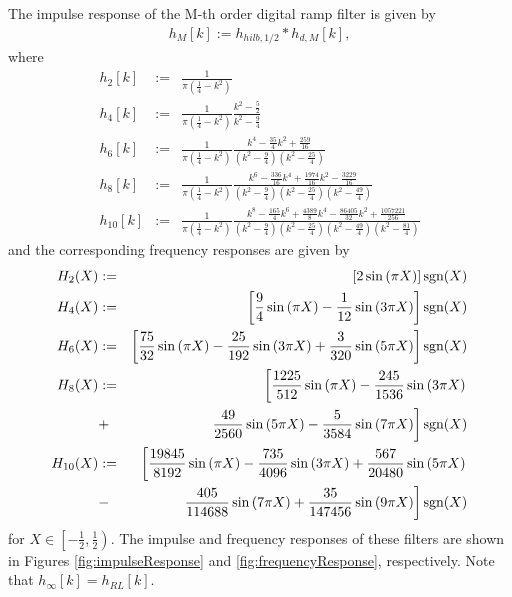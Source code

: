 The impulse response of the M-th order digital ramp filter is given by
\begin{eqnarray}
h_M[k] := h_{hilb,1/2} * h_{d,M}[k], \label{eq:convHilbertAndDeriv}
\end{eqnarray}
where
\begin{eqnarray}
h_2[k] &:=& \frac{1}{\pi\left(\frac{1}{4}-k^2\right)} \label{eq:RAMP_FD2} \\
h_4[k] &:=& \frac{1}{\pi\left(\frac{1}{4}-k^2\right)} \frac{k^2-\frac{5}{2}}{k^2-\frac{9}{4}} \label{eq:RAMP_FD4} \\
h_6[k] &:=& \frac{1}{\pi\left(\frac{1}{4}-k^2\right)} \frac{k^4-\frac{35}{4}k^2+\frac{259}{16}}{\left(k^2-\frac{9}{4}\right)\left(k^2-\frac{25}{4}\right)} \label{eq:RAMP_FD6} \\
h_8[k] &:=& \frac{1}{\pi\left(\frac{1}{4}-k^2\right)} \frac{k^6-\frac{336}{16}k^4+\frac{1974}{16}k^2-\frac{3229}{16}}{\left(k^2-\frac{9}{4}\right)\left(k^2-\frac{25}{4}\right)\left(k^2-\frac{49}{4}\right)} \label{eq:RAMP_FD8} \\
h_{10}[k] &:=& \frac{1}{\pi\left(\frac{1}{4}-k^2\right)} \frac{k^8 - \frac{165}{4}k^6 + \frac{4389}{8}k^4 - \frac{86405}{32}k^2 + \frac{1057221}{256}}{\left(k^2-\frac{9}{4}\right)\left(k^2-\frac{25}{4}\right)\left(k^2-\frac{49}{4}\right)\left(k^2-\frac{81}{4}\right)} \label{eq:RAMP_FD10}
\end{eqnarray}
and the corresponding frequency responses are given by
\begin{eqnarray}
H_2(X) &:=& \left[2\sin\left(\pi X\right)\right]\text{sgn}(X) \label{eq:rampFreq2} \\
H_4(X) &:=& \left[\frac{9}{4}\sin\left(\pi X\right) - \frac{1}{12}\sin\left(3\pi X\right)\right]\text{sgn}(X) \\
H_6(X) &:=& \left[\frac{75}{32}\sin\left(\pi X\right) - \frac{25}{192}\sin\left(3\pi X\right) + \frac{3}{320}\sin\left(5\pi X\right)\right]\text{sgn}(X) \\
H_8(X) &:=& \left[\frac{1225}{512}\sin\left(\pi X\right) - \frac{245}{1536}\sin\left(3\pi X\right) \right. \notag \\ &+& \left. \frac{49}{2560}\sin\left(5\pi X\right) - \frac{5}{3584}\sin\left(7\pi X\right)\right]\text{sgn}(X) \\
H_{10}(X) &:=& \left[\frac{19845}{8192}\sin\left(\pi X\right) - \frac{735}{4096}\sin\left(3\pi X\right) + \frac{567}{20480}\sin\left(5\pi X\right) \right. \notag \\ &-& \left. \frac{405}{114688}\sin\left(7\pi X\right) + \frac{35}{147456}\sin\left(9\pi X\right)\right]\text{sgn}(X) \label{eq:rampFreq10}
\end{eqnarray}
for $X \in \left[-\frac{1}{2}, \frac{1}{2}\right)$.  The impulse and frequency responses of these filters are shown in Figures \ref{fig:impulseResponse} and \ref{fig:frequencyResponse}, respectively.  Note that $h_{\infty}[k] = h_{RL}[k]$.

